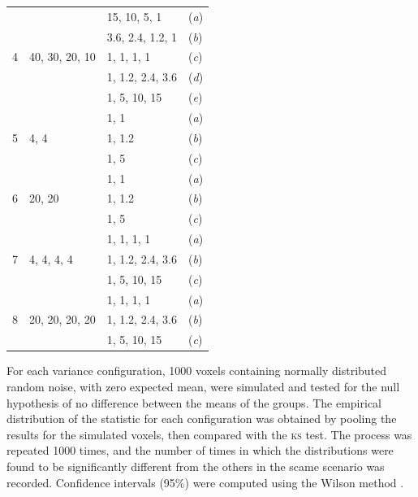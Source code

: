\begin{table}[!p]
\begin{center}
{\begin{tabular}{@{}m{20mm}<{\raggedright}m{28mm}<{\raggedright}m{23mm}<{\raggedright}m{10mm}<{\centering}@{}}
\midrule
\multirow{5}{*}{4} & \multirow{5}{*}{40, 30, 20, 10} & 15, 10, 5, 1     & (\emph{a}) \\
{}                 & {}                              & 3.6, 2.4, 1.2, 1 & (\emph{b}) \\
{}                 & {}                              & 1, 1, 1, 1       & (\emph{c}) \\
{}                 & {}                              & 1, 1.2, 2.4, 3.6 & (\emph{d}) \\
{}                 & {}                              & 1, 5, 10, 15     & (\emph{e}) \\
\midrule
\multirow{3}{*}{5} & \multirow{3}{*}{4, 4}   & 1, 1   & (\emph{a}) \\
{}                 & {}                      & 1, 1.2 & (\emph{b}) \\
{}                 & {}                      & 1, 5   & (\emph{c}) \\
\midrule
\multirow{3}{*}{6} & \multirow{3}{*}{20, 20} & 1, 1   & (\emph{a}) \\
{}                 & {}                      & 1, 1.2 & (\emph{b}) \\
{}                 & {}                      & 1, 5   & (\emph{c}) \\
\midrule
\multirow{3}{*}{7} & \multirow{3}{*}{4, 4, 4, 4} & 1, 1, 1, 1       & (\emph{a}) \\
{}                 & {}                          & 1, 1.2, 2.4, 3.6 & (\emph{b}) \\
{}                 & {}                          & 1, 5, 10, 15     & (\emph{c}) \\
\midrule
\multirow{3}{*}{8} & \multirow{3}{*}{20, 20, 20, 20} & 1, 1, 1, 1       & (\emph{a}) \\
{}                 & {}                              & 1, 1.2, 2.4, 3.6 & (\emph{b}) \\
{}                 & {}                              & 1, 5, 10, 15     & (\emph{c}) \\
\bottomrule
\end{tabular}}
\end{center}
\label{tab:perm:kolmo}
\end{table}

For each variance configuration, 1000 voxels containing normally distributed random noise, with zero expected mean, were simulated and tested for the null hypothesis of no difference between the means of the groups. The empirical distribution of the statistic for each configuration was obtained by pooling the results for the simulated voxels, then compared with the \textsc{ks} test. The process was repeated 1000 times, and the number of times in which the distributions were found to be significantly different from the others in the scame scenario was recorded. Confidence intervals (95\%) were computed using the Wilson method \citep{Wilson1927}.

